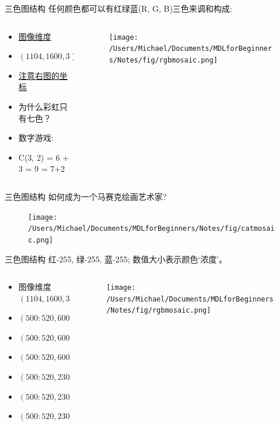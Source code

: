 \documentclass[handout]{beamer}
\begin{document}
\begin{frame}{三色图结构}
任何颜色都可以有红绿蓝(R, G, B)三色来调和构成:
\begin{columns}
	\begin{column}{0.35\textwidth}
		\begin{itemize}
			\item \underline{图像维度} 
			\item \footnotesize{$(1104, 1600, 3)$}
			\item \underline{注意右图的坐标}
			\item 为什么彩虹只有七色？
			\item 数字游戏:
			\item C(3, 2) = 6 + 3 = 9 = 7+2 
		\end{itemize}
	\end{column}
	\begin{column}{0.65\textwidth}
		\begin{figure}[H]
	\texttt{[image: /Users/Michael/Documents/MDLforBeginners/Notes/fig/rgbmosaic.png]}
\end{figure}	
	\end{column}
\end{columns}
\end{frame}

\begin{frame}{三色图结构}
	如何成为一个马赛克绘画艺术家?
	\begin{figure}[H]
		\centering
		\texttt{[image: /Users/Michael/Documents/MDLforBeginners/Notes/fig/catmosaic.png]}
	\end{figure}
\end{frame}

\begin{frame}{三色图结构}
红-255, 绿-255, 蓝-255; 数值大小表示颜色`浓度’。
\begin{columns}
	\begin{column}{0.35\textwidth}
		\begin{itemize}
			\item \footnotesize{图像维度 $(1104, 1600, 3)$}
			\item $(500:520, 600:620, 0)$
			\item $(500:520, 600:620, 1)$
			\item $(500:520, 600:620, 2)$
			\item $(500:520, 230:250, 0)$
			\item $(500:520, 230:250, 1)$
			\item $(500:520, 230:250, 2)$
		\end{itemize}
	\end{column}
	\begin{column}{0.65\textwidth}
		\begin{figure}[H]
	\texttt{[image: /Users/Michael/Documents/MDLforBeginners/Notes/fig/rgbmosaic.png]}
\end{figure}	
	\end{column}
\end{columns}
\end{frame}
\end{document}
